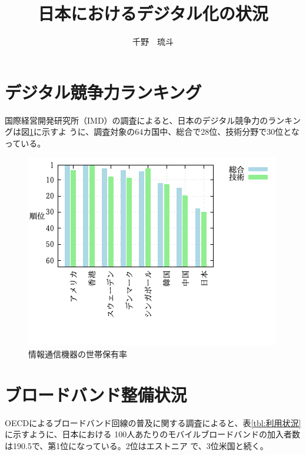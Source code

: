 \documentclass[a4paper,11pt,dvipdfmx]{ujarticle}
\title{日本におけるデジタル化の状況}
\author{千野　琉斗}
\begin{document}
\maketitle %

\section{デジタル競争力ランキング}

国際経営開発研究所（IMD）の調査\cite{imd}によると、日本のデジタル競争力のランキングは図\ref{fig:ランキング}に示すよ
うに、調査対象の64カ国中、総合で28位、技術分野で30位となっている。
\begin{figure}[htbp]
    \centering
    \includegraphics[width=0.7\linewidth]{fig41.png}
    \caption{情報通信機器の世帯保有率}\label{fig:ランキング}
\end{figure}
\newpage




\section{ブロードバンド整備状況}
OECDによるブロードバンド回線の普及に関する調査\cite{oecd}によると、表\ref{tbl:利用状況}に示すように、日本における 100人あたりのモバイルブロードバンドの加入者数は190.5で、第1位になっている。2位はエストニア
で、3位米国と続く。
\end{document}
